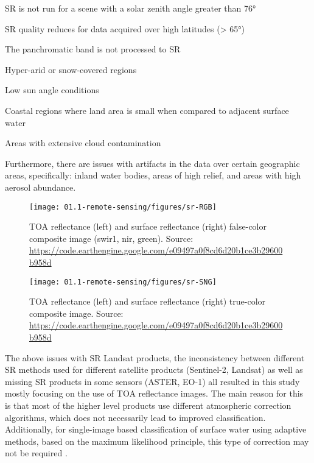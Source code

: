 \begin{enumerate*}[label=(\emph{\alph*})]
	\item SR is not run for a scene with a solar zenith angle greater than 76°
	\item SR quality reduces for data acquired over high latitudes (> 65°)
	\item The panchromatic band is not processed to SR
	\item Hyper-arid or snow-covered regions
	\item Low sun angle conditions
	\item Coastal regions where land area is small when compared to adjacent surface water
	\item Areas with extensive cloud contamination
\end{enumerate*}

Furthermore, there are issues with artifacts in the data over certain geographic areas, specifically: inland water bodies, areas of high relief, and areas with high aerosol abundance. 

\begin{figure}
	\texttt{[image: 01.1-remote-sensing/figures/sr-RGB]}
	\caption{TOA reflectance (left) and surface reflectance (right) false-color composite image (swir1, nir, green). Source: \url{https://code.earthengine.google.com/e09497a0f8cd6d20b1ce3b29600b958d}}
	\label{fig:example-sr-rgb}
\end{figure}

\begin{figure}
	\texttt{[image: 01.1-remote-sensing/figures/sr-SNG]}
	\caption{TOA reflectance (left) and surface reflectance (right) true-color composite image. Source: \url{https://code.earthengine.google.com/e09497a0f8cd6d20b1ce3b29600b958d}}
	\label{fig:example-sr-sng}
\end{figure}

The above issues with SR Landsat products, the inconsistency between different SR methods used for different satellite products (Sentinel-2, Landsat) as well as missing SR products in some sensors (ASTER, EO-1) all resulted in this study mostly focusing on the use of TOA reflectance images. The main reason for this is that most of the higher level products use different atmospheric correction algorithms, which does not necessarily lead to improved classification. Additionally, for single-image based classification of surface water using adaptive methods, based on the maximum likelihood principle, this type of correction may not be required \citet{song2001classification}.


